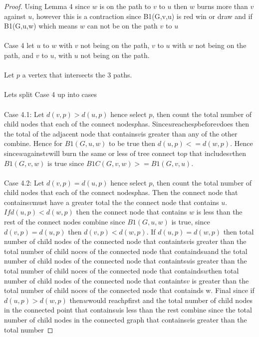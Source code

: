 \documentclass{article}
\begin{document}
\begin{proof}
Using Lemma 4 since \(w\) is on the path to \(v\) to \(u\) then \(w\) burns more than \(v\) against \(u\), however this is a contraction since B1(G,v,u) is red win or draw and if B1(G,u,w) which means \(w\) can not be on the path \(v\) to \(u\)
\\ \\
Case 4 let \(u\) to \(w\) with \(v\)  not being on the path, \(v\) to \(u\)  with \(w\)  not being on the path, and \(v\) to \(u\),  with \(u\)  not being on the path.
\\ \\
Let \(p\) a vertex that intersects the 3 paths.
\\\\
Lets split Case 4 up into cases
\\\\
Case 4.1: Let \(d(v,p) > d(u,p)\) hence select \(p\), then count the total number of child nodes that each of the connect nodes\(p\)has. 
Since\(u\)reaches\(p\)before\(v\)does then the total of the adjacent node that contains\(v\)is greater than any of the other combine. 
Hence for \(B1(G,u,w)\) to be true then \(d(u,p) <= d(w,p).\) Hence since\(w\)against\(v\)will burn the same or less of tree connect to\(p\)
that includes\(v\)then \(B1(G,v,w)\) is true since \(B1C(G,v,w) >= B1(G,v,u)\).
\\\\
Case 4.2: Let \(d(v,p) = d(u,p)\) hence select \(p\), then count the total number of child nodes 
that each of the connect nodes\(p\)has. Then the connect node that contains\(v\)must have a greater 
total the the connect node that contains \(u\). \(If d(u,p) < d(w,p)\) then the connect node that contains 
\(w\) is less than the rest of the connect nodes combine since \(B1(G,u,w)\) is true, since \(d(v,p) = d(u,p)\) 
then \(d(v,p) < d(w,p)\). If \(d(u,p) = d(w,p)\) then total number of child nodes of the connected node that 
containts\(v\)is greater than the total number of child noces of the connected node that containds\(u\)and 
the total number of child nodes of the connected node that containts\(u\)is greater than the total number of child 
noces of the connected node that containds\(w\)then total number of child nodes of the connected node that containts\(v\)
is greater than the total number of child noces of the connected node that containds w. Final since if \(d(u,p) > d(w,p)\) 
then\(w\)would reach\(p\)first and the total number of child nodes in the connected point that contains\(u\)is less than the 
rest combine since the total number of child nodes in the connected graph that contains\(v\)is greater than the total number 

\end{proof}
\end{document}
